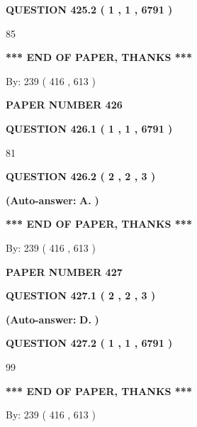 \documentclass{ctexart}
\begin{document}
  
{\textbf{\large{QUESTION
425.2 
 ( 1 , 1 , 6791 )
}}}

85
   
   
   
   
\vspace{1.0in} 
{\textbf{\large{ *** END OF PAPER, THANKS *** }}} 
   
   
\hspace{1.0in} By: 
 239 ( 416 ,  613 )
   
   
   
   
\newpage 
\setcounter{page}{ 
   426001 } 
   
   
 {\textbf{ \Large{ PAPER NUMBER  426  }}}
   
   
   
   
  
  
{\textbf{\large{QUESTION
426.1 
 ( 1 , 1 , 6791 )
}}}

81
  
  
{\textbf{\large{QUESTION
426.2 
 ( 2 , 2 , 3 )
}}}
 
 
{\textbf{(Auto-answer:}}
{\textbf{\large{
A.}}}
{\textbf{)}}
 
 
   
   
   
   
\vspace{1.0in} 
{\textbf{\large{ *** END OF PAPER, THANKS *** }}} 
   
   
\hspace{1.0in} By: 
 239 ( 416 ,  613 )
   
   
   
   
\newpage 
\setcounter{page}{ 
   427001 } 
   
   
 {\textbf{ \Large{ PAPER NUMBER  427  }}}
   
   
   
   
  
  
{\textbf{\large{QUESTION
427.1 
 ( 2 , 2 , 3 )
}}}
 
 
{\textbf{(Auto-answer:}}
{\textbf{\large{
D.}}}
{\textbf{)}}
 
 
  
  
{\textbf{\large{QUESTION
427.2 
 ( 1 , 1 , 6791 )
}}}

99
   
   
   
   
\vspace{1.0in} 
{\textbf{\large{ *** END OF PAPER, THANKS *** }}} 
   
   
\hspace{1.0in} By: 
 239 ( 416 ,  613 )
   
   
   
\end{document}
